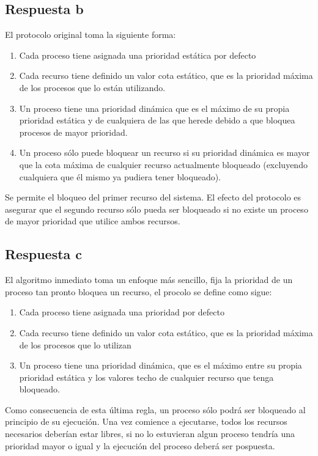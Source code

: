 \documentclass[a4paper,10pt]{article}
\begin{document}
\subsection{Respuesta b}

El protocolo original toma la siguiente forma:

\begin{enumerate}
	\item Cada proceso tiene asignada una prioridad estática por defecto
	\item Cada recurso tiene definido un valor cota estático, que es la
		prioridad máxima de los procesos que lo están utilizando.
	\item Un proceso tiene una prioridad dinámica que es el máximo de su
		propia prioridad estática y de cualquiera de las que herede
		debido a que bloquea procesos de mayor prioridad.
	\item Un proceso sólo puede bloquear un recurso si su prioridad dinámica
		es mayor que la cota máxima de cualquier recurso actualmente
		bloqueado (excluyendo cualquiera que él mismo ya pudiera tener
		bloqueado).
\end{enumerate}

Se permite el bloqueo del primer recurso del sistema. El efecto del protocolo es
asegurar que el segundo recurso sólo pueda ser bloqueado si no existe un proceso
de mayor prioridad que utilice ambos recursos.

\subsection{Respuesta c}

El algoritmo inmediato toma un enfoque más sencillo, fija la prioridad de un
proceso tan pronto bloquea un recurso, el procolo se define como sigue:

\begin{enumerate}
	\item Cada proceso tiene asignada una prioridad por defecto
	\item Cada recurso tiene definido un valor cota estático, que es la
		prioridad máxima de los procesos que lo utilizan
	\item Un proceso tiene una prioridad dinámica, que es el máximo entre su
		propia prioridad estática y los valores techo de cualquier
		recurso que tenga bloqueado.
\end{enumerate}

Como consecuencia de esta última regla, un proceso sólo podrá ser bloqueado al
principio de su ejecución. Una vez comience a ejecutarse, todos los recursos
necesarios deberían estar libres, si no lo estuvieran algun proceso tendría una
prioridad mayor o igual y la ejecución del proceso deberá ser pospuesta.
\end{document}
